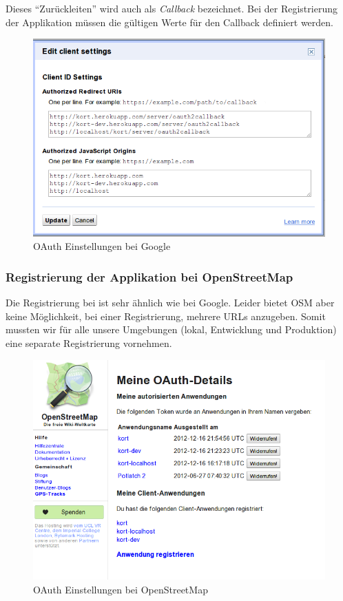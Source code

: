 Dieses "`Zurückleiten"' wird auch als \emph{Callback} bezeichnet.
Bei der Registrierung der Applikation müssen die gültigen Werte für den Callback definiert werden.

\begin{figure}[H]
	\centering
	\includegraphics[scale=0.5]{images/implementation/backend/oauth-google-settings}
	\caption{OAuth Einstellungen bei Google}
\end{figure}

\subsubsection{Registrierung der Applikation bei OpenStreetMap}
Die Registrierung bei  ist sehr ähnlich wie bei Google.
Leider bietet OSM aber keine Möglichkeit, bei einer Registrierung, mehrere URLs anzugeben.
Somit mussten wir für alle unsere Umgebungen (lokal, Entwicklung und Produktion) eine separate Registrierung vornehmen.

\begin{figure}[H]
	\centering
	\includegraphics[scale=0.5]{images/implementation/backend/oauth-osm}
	\caption{OAuth Einstellungen bei OpenStreetMap}
\end{figure}

